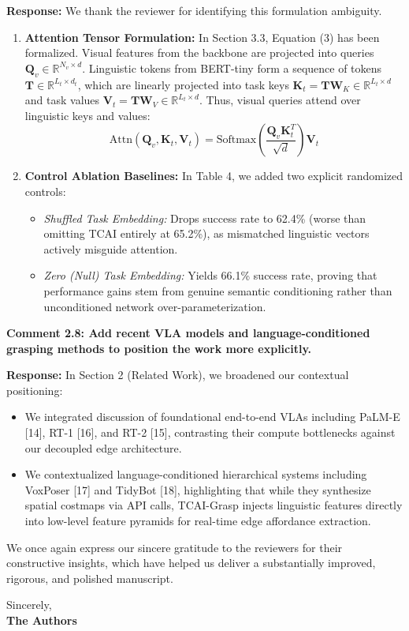 \documentclass[11pt]{article}
\newcommand{\reviewercomment}[1]{\vspace{1.8ex}\noindent\textbf{\textcolor{revcolor}{#1}}}
\newcommand{\response}{\vspace{1ex}\noindent\textbf{Response: }}
\begin{document}
\response
We thank the reviewer for identifying this formulation ambiguity.
\begin{enumerate}[leftmargin=*]
    \item \textbf{Attention Tensor Formulation:} In Section 3.3, Equation (3) has been formalized. Visual features from the backbone are projected into queries $\mathbf{Q}_v \in \mathbb{R}^{N_v \times d}$. Linguistic tokens from BERT-tiny form a sequence of tokens $\mathbf{T} \in \mathbb{R}^{L_t \times d_t}$, which are linearly projected into task keys $\mathbf{K}_t = \mathbf{T}\mathbf{W}_K \in \mathbb{R}^{L_t \times d}$ and task values $\mathbf{V}_t = \mathbf{T}\mathbf{W}_V \in \mathbb{R}^{L_t \times d}$. Thus, visual queries attend over linguistic keys and values:
    \begin{equation*}
        \text{Attn}(\mathbf{Q}_v, \mathbf{K}_t, \mathbf{V}_t) = \text{Softmax}\left(\frac{\mathbf{Q}_v \mathbf{K}_t^T}{\sqrt{d}}\right) \mathbf{V}_t
    \end{equation*}
    \item \textbf{Control Ablation Baselines:} In Table 4, we added two explicit randomized controls:
    \begin{itemize}
        \item \textit{Shuffled Task Embedding:} Drops success rate to 62.4\% (worse than omitting TCAI entirely at 65.2\%), as mismatched linguistic vectors actively misguide attention.
        \item \textit{Zero (Null) Task Embedding:} Yields 66.1\% success rate, proving that performance gains stem from genuine semantic conditioning rather than unconditioned network over-parameterization.
    \end{itemize}
\end{enumerate}

\reviewercomment{Comment 2.8: Add recent VLA models and language-conditioned grasping methods to position the work more explicitly.}

\response
In Section 2 (Related Work), we broadened our contextual positioning:
\begin{itemize}[leftmargin=*]
    \item We integrated discussion of foundational end-to-end VLAs including PaLM-E [14], RT-1 [16], and RT-2 [15], contrasting their compute bottlenecks against our decoupled edge architecture.
    \item We contextualized language-conditioned hierarchical systems including VoxPoser [17] and TidyBot [18], highlighting that while they synthesize spatial costmaps via API calls, TCAI-Grasp injects linguistic features directly into low-level feature pyramids for real-time edge affordance extraction.
\end{itemize}

\vspace{3ex}
\noindent We once again express our sincere gratitude to the reviewers for their constructive insights, which have helped us deliver a substantially improved, rigorous, and polished manuscript.

\vspace{2ex}
\noindent Sincerely,\\
\textbf{The Authors}
\end{document}

